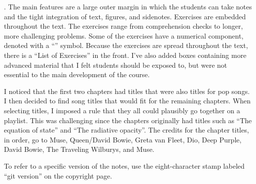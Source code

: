 . The main features are a large outer margin in which the students can take notes and the tight integration of text, figures, and sidenotes. Exercises are embedded throughout the text. The exercises range from comprehension checks to longer, more challenging problems. Some of the exercises have a numerical component, denoted with a ``\notebook'' symbol. Because the exercises are spread throughout the text, there is a ``List of Exercises'' in the front. I've also added boxes containing more advanced material that I felt students should be exposed to, but were not essential to the main development of the course. 

 I noticed that the first two chapters had titles that were also titles for pop songs. I then decided to find song titles that would fit for the remaining chapters. When selecting titles, I imposed a rule that they all could plausibly go together on a playlist. This was challenging since the chapters originally had titles such as ``The equation of state'' and ``The radiative opacity''. The credits for the chapter titles, in order, go to Muse, Queen/David Bowie, Greta van Fleet, Dio, Deep Purple, David Bowie, The Traveling Wilburys, and Muse.

 To refer to a specific version of the notes, use the eight-character stamp labeled ``git version'' on the copyright page.
